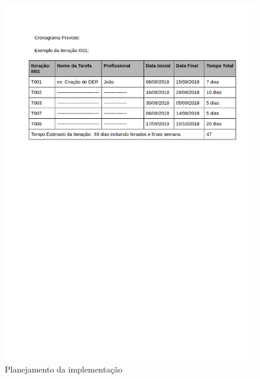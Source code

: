\documentclass[	DIV=calc,%
							paper=a4,%
							fontsize=12pt,%
							onecolumn]{scrartcl}	 					%
\begin{document}
\begin{figure}
	\centering
	\includegraphics[width=\textwidth]{4-3.png}
	\caption{Planejamento da implementação}
	\label{Figura 6}
\end{figure}
\end{document}
